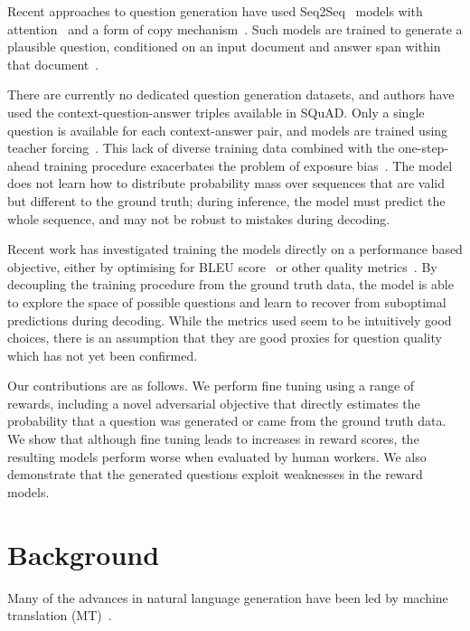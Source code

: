 \documentclass[11pt,a4paper]{article}
\begin{document}
Recent approaches to question generation have used Seq2Seq~\cite{Sutskever2014} models with attention~\cite{Bahdanau2014} and a form of copy mechanism~\cite{Vinyals2015, Gulcehre2016}. Such models are trained to generate a plausible question, conditioned on an input document and answer span within that document~\cite{Zhou2018,Du,Du2018,Maluuba}.

There are currently no dedicated question generation datasets, and authors have used the context-question-answer triples available in SQuAD. Only a single question is available for each context-answer pair, and models are trained using teacher forcing~\cite{TeacherForce}. This lack of diverse training data combined with the one-step-ahead training procedure exacerbates the problem of exposure bias~\cite{Ranzato2015}. The model does not learn how to distribute probability mass over sequences that are valid but different to the ground truth; during inference, the model must predict the whole sequence, and may not be robust to mistakes during decoding. 

Recent work has investigated training the models directly on a performance based objective, either by optimising for BLEU score~\cite{Kumar2018} or other quality metrics~\cite{Maluuba}. By decoupling the training procedure from the ground truth data, the model is able to explore the space of possible questions and learn to recover from suboptimal predictions during decoding. While the metrics used seem to be intuitively good choices, there is an assumption that they are good proxies for question quality which has not yet been confirmed.

Our contributions are as follows. We perform fine tuning using a range of rewards, including a novel adversarial objective that directly estimates the probability that a question was generated or came from the ground truth data. We show that although fine tuning leads to increases in reward scores, the resulting models perform worse when evaluated by human workers. We also demonstrate that the generated questions exploit weaknesses in the reward models.




\section{Background}

Many of the advances in natural language generation have been led by machine translation (MT)~\cite{Sutskever2014,Bahdanau2014,Gulcehre2016}.
\end{document}
